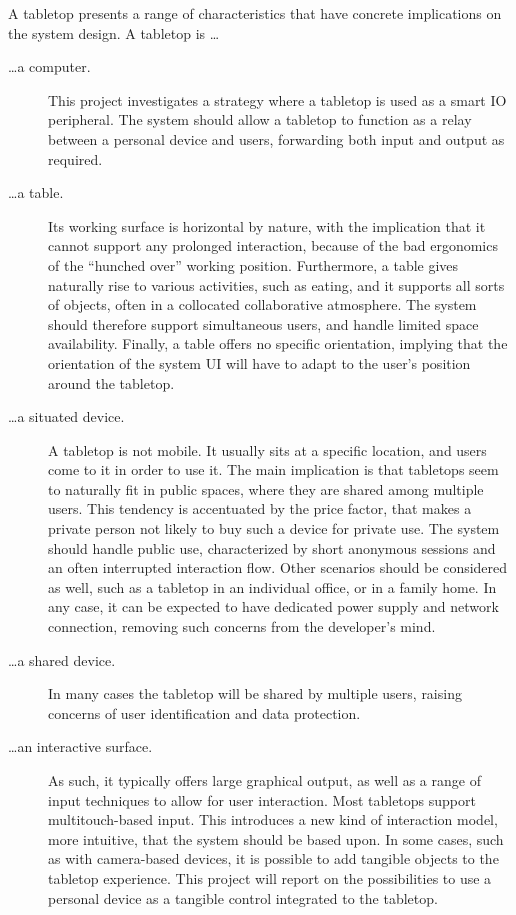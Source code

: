 A tabletop presents a range of characteristics that have concrete implications on the system design.
A tabletop is \ldots
\begin{description}

\item[\ldots a computer.] This project investigates a strategy where a tabletop is used as a smart IO peripheral.
The system should allow a tabletop to function as a relay between a personal device and users, forwarding both input and output as required.

\item[\ldots a table.] Its working surface is horizontal by nature, with the implication that it cannot support any prolonged interaction, because of the bad ergonomics of the ``hunched over'' working position.
Furthermore, a table gives naturally rise to various activities, such as eating, and it supports all sorts of objects, often in a collocated collaborative atmosphere.
The system should therefore support simultaneous users, and handle limited space availability.
Finally, a table offers no specific orientation, implying that the orientation of the system UI will have to adapt to the user's position around the tabletop.

\item[\ldots a situated device.] A tabletop is not mobile.
It usually sits at a specific location, and users come to it in order to use it.
The main implication is that tabletops seem to naturally fit in public spaces, where they are shared among multiple users.
This tendency is accentuated by the price factor, that makes a private person not likely to buy such a device for private use.
The system should handle public use, characterized by short anonymous sessions and an often interrupted interaction flow.
Other scenarios should be considered as well, such as a tabletop in an individual office, or in a family home.
In any case, it can be expected to have dedicated power supply and network connection, removing such concerns from the developer's mind.

\item[\ldots a shared device.] In many cases the tabletop will be shared by multiple users, raising concerns of user identification and data protection.

\item[\ldots an interactive surface.] As such, it typically offers large graphical output, as well as a range of input techniques to allow for user interaction.
Most tabletops support multitouch-based input.
This introduces a new kind of interaction model, more intuitive, that the system should be based upon.
In some cases, such as with camera-based devices, it is possible to add tangible objects to the tabletop experience.
This project will report on the possibilities to use a personal device as a tangible control integrated to the tabletop.

\end{description}

